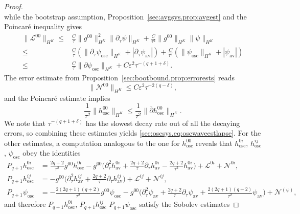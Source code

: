 \documentclass{article}
\newcommand{\osc}{\mathrm{osc}}
\newcommand{\av}{\mathrm{av}}
\newcommand{\mc}{\mathcal}
\newcommand{\ol}{\overline}
\newcommand{\ve}{\varepsilon}
\newcommand{\pa}{\partial}
\begin{document}
\begin{proof}
\begin{equation}
    \end{equation}
    while the bootstrap assumption, Proposition~\ref{sec:avgsys.prop:avgest} and the Poincar\'e inequality gives
    \begin{align}
        \|\mc{L}^{00}\|_{H^K} \leq& \frac{C}{\tau}\|g^{00}\|_{H^K}^2\|\pa_\tau \psi\|_{H^K} + \frac{C}{\tau^2}\|g^{00}\|_{H^K} \|\psi\|_{H^K}\nonumber\\
        \leq&\frac{C}{\tau}(\|\pa_\tau \psi_{\osc}\|_{H^K} + |\pa_\tau \psi_{\av}|) + \frac{C}{\tau^2}(\|\psi_{\osc}\|_{H^K} + |\psi_{\av}|)\nonumber\\
        \leq&\frac{C}{\tau}\|\pa \psi_{\osc}\|_{H^K} + C\ve^2\tau^{-(q+1+\delta)}.
    \end{align}
    The error estimate from Proposition~\ref{sec:bootbound.prop:errorests} reads
    \begin{equation}
        \|\mc{N}^{00}\|_{H^K} \leq C \ve^2\tau^{-2(q-\delta)},
    \end{equation}
    and the Poincar\'e estimate implies
    \begin{equation}
        \frac{1}{\tau^2}\|h_{\osc}^{00}\|_{H^K} \leq \frac{1}{\tau^2}\|\ol{\pa}h_{\osc}^{00}\|_{H^K}.
    \end{equation}
    We note that $\tau^{-(q+1+\delta)}$ has the slowest decay rate out of all the decaying errors, so combining these estimates yields \eqref{sec:oscsys.eq:oscwaveestlapse}.
    For the other estimates, a computation analogous to the one for $h_{\osc}^{00}$ reveals that $h_{\osc}^{0i}$, $h_{\osc}^{ij}$, $\psi_{\osc}$ obey the identities
    \begin{subequations}
        \begin{align}
        P_{q+1}h_{\osc}^{0i} &= \frac{2q+2}{\tau^2}g^{00}h_{\osc}^{0i} - g^{00}\Big(\pa_\tau^2 h_{\av}^{0i} + \frac{2q+2}{\tau}\pa_\tau h_{\av}^{0i} - \frac{2q+2}{\tau^2}h_{\av}^{0i}\Big)+\mc{L}^{0i}+\mc{N}^{0i},\\
        P_{q+1}h_{\osc}^{ij} &=  - g^{00}\Big(\pa_\tau^2 h_{\av}^{ij} + \frac{2q+2}{\tau}\pa_\tau h_{\av}^{ij}\Big)+\mc{L}^{ij}+\mc{N}^{ij},\\
        P_{q+1}\psi_{\osc} &= -\frac{2(2q+1)(q+2)}{\tau^2}g^{00}\psi_{\osc} - g^{00}\Big(\pa_\tau^2 \psi_{\av} + \frac{2q+2}{\tau}\pa_\tau \psi_{\av} + \frac{2(2q+1)(q+2)}{\tau^2}\psi_{\av}\Big)+\mc{N}^{(\psi)},
        \end{align}
    \end{subequations}
    and therefore $P_{q+1} h_{\osc}^{0i}$, $P_{q+1} h_{\osc}^{ij}$ $P_{q+1} \psi_{\osc}$ satisfy the Sobolev estimates

\end{proof}
\end{document}
